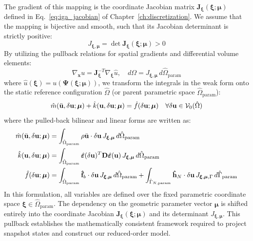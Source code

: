 The gradient of this mapping is the coordinate Jacobian matrix $\mathbf{J}_{\boldsymbol{\xi}}(\boldsymbol{\xi}; \boldsymbol{\mu})$ defined in Eq.~\eqref{eq:iga_jacobian} of Chapter~\ref{ch:discretization}. We assume that the mapping is bijective and smooth, such that its Jacobian determinant is strictly positive:
\begin{equation}
    J_{\boldsymbol{\xi}, \boldsymbol{\mu}} = \det \mathbf{J}_{\boldsymbol{\xi}}(\boldsymbol{\xi}; \boldsymbol{\mu}) > 0
\end{equation}
By utilizing the pullback relations for spatial gradients and differential volume elements:
\begin{equation}
    \nabla_{\boldsymbol{x}} u = \mathbf{J}_{\boldsymbol{\xi}}^{-T} \nabla_{\boldsymbol{\xi}} \hat{u}, \quad d\Omega = J_{\boldsymbol{\xi}, \boldsymbol{\mu}} \, d\hat{\Omega}_{\text{param}}
\end{equation}
where $\hat{u}(\boldsymbol{\xi}) = u(\boldsymbol{\Psi}(\boldsymbol{\xi}; \boldsymbol{\mu}))$, we transform the integrals in the weak form onto the static reference configuration $\hat{\Omega}$ (or parent parametric space $\hat{\Omega}_{\text{param}}$):
\begin{equation}
    \hat{m}(\ddot{\mathbf{u}}, \delta\mathbf{u}; \boldsymbol{\mu}) + \hat{k}(\mathbf{u}, \delta\mathbf{u}; \boldsymbol{\mu}) = \hat{f}(\delta\mathbf{u}; \boldsymbol{\mu}) \quad \forall \delta\mathbf{u} \in \mathcal{V}_0(\hat{\Omega})
\end{equation}
where the pulled-back bilinear and linear forms are written as:
\begin{align}
    \hat{m}(\ddot{\mathbf{u}}, \delta\mathbf{u}; \boldsymbol{\mu}) & = \int_{\hat{\Omega}_{\text{param}}} \rho \ddot{\mathbf{u}} \cdot \delta\mathbf{u} \, J_{\boldsymbol{\xi}, \boldsymbol{\mu}} \, d\hat{\Omega}_{\text{param}}                                                                                                                                        \\
    \hat{k}(\mathbf{u}, \delta\mathbf{u}; \boldsymbol{\mu})        & = \int_{\hat{\Omega}_{\text{param}}} \hat{\boldsymbol{\varepsilon}}(\delta\mathbf{u})^T \mathbf{D} \hat{\boldsymbol{\varepsilon}}(\mathbf{u}) \, J_{\boldsymbol{\xi}, \boldsymbol{\mu}} \, d\hat{\Omega}_{\text{param}}                                   \\
    \hat{f}(\delta\mathbf{u}; \boldsymbol{\mu})                       & = \int_{\hat{\Omega}_{\text{param}}} \mathbf{\hat{f}}_b \cdot \delta\mathbf{u} \, J_{\boldsymbol{\xi}, \boldsymbol{\mu}} \, d\hat{\Omega}_{\text{param}} + \int_{\hat{\Gamma}_{N,\text{param}}} \mathbf{\hat{h}}_N \cdot \delta\mathbf{u} \, J_{\boldsymbol{\xi}, \boldsymbol{\mu}, \Gamma} \, d\hat{\Gamma}_{\text{param}}
\end{align}
In this formulation, all variables are defined over the fixed parametric coordinate space $\boldsymbol{\xi} \in \hat{\Omega}_{\text{param}}$. The dependency on the geometric parameter vector $\boldsymbol{\mu}$ is shifted entirely into the coordinate Jacobian $\mathbf{J}_{\boldsymbol{\xi}}(\boldsymbol{\xi}; \boldsymbol{\mu})$ and its determinant $J_{\boldsymbol{\xi}, \boldsymbol{\mu}}$. This pullback establishes the mathematically consistent framework required to project snapshot states and construct our reduced-order model.

